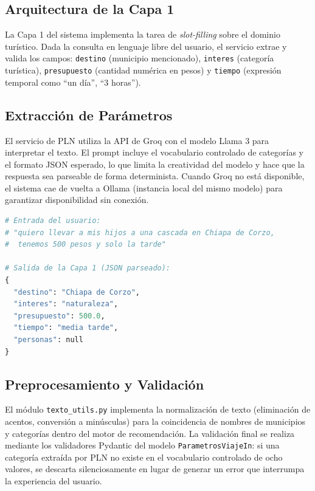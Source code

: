 \documentclass[12pt,letterpaper]{report}
\begin{document}
\subsection{Arquitectura de la Capa 1}

La Capa 1 del sistema implementa la tarea de \textit{slot-filling} sobre el dominio turístico.
Dada la consulta en lenguaje libre del usuario, el servicio extrae y valida los campos:
\texttt{destino} (municipio mencionado), \texttt{interes} (categoría turística),
\texttt{presupuesto} (cantidad numérica en pesos) y \texttt{tiempo} (expresión temporal
como ``un día'', ``3 horas'').

\subsection{Extracción de Parámetros}

El servicio de PLN utiliza la API de Groq con el modelo Llama 3 para interpretar el texto.
El prompt incluye el vocabulario controlado de categorías y el formato JSON esperado, lo que
limita la creatividad del modelo y hace que la respuesta sea parseable de forma determinista.
Cuando Groq no está disponible, el sistema cae de vuelta a Ollama (instancia local del mismo
modelo) para garantizar disponibilidad sin conexión.

\begin{lstlisting}[language=Python, caption=Ejemplo de extracción de parámetros por PLN]
# Entrada del usuario:
# "quiero llevar a mis hijos a una cascada en Chiapa de Corzo,
#  tenemos 500 pesos y solo la tarde"

# Salida de la Capa 1 (JSON parseado):
{
  "destino": "Chiapa de Corzo",
  "interes": "naturaleza",
  "presupuesto": 500.0,
  "tiempo": "media tarde",
  "personas": null
}
\end{lstlisting}

\subsection{Preprocesamiento y Validación}

El módulo \texttt{texto\_utils.py} implementa la normalización de texto (eliminación de
acentos, conversión a minúsculas) para la coincidencia de nombres de municipios y categorías
dentro del motor de recomendación. La validación final se realiza mediante los validadores
Pydantic del modelo \texttt{ParametrosViajeIn}: si una categoría extraída por PLN no existe
en el vocabulario controlado de ocho valores, se descarta silenciosamente en lugar de generar
un error que interrumpa la experiencia del usuario.
\end{document}
